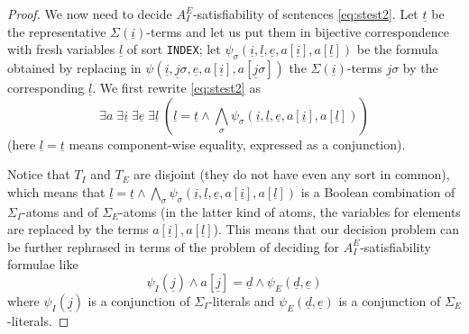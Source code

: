 \documentclass{LMCS}
\newcommand{\ud}{\ensuremath{\underline d}}
\newcommand{\ue}{\ensuremath{\underline e}}
\newcommand{\ui}{\ensuremath{\underline i}}
\newcommand{\uj}{\ensuremath{\underline j}}
\newcommand{\ut}{\ensuremath{\underline t}}
\newcommand{\ul}{\ensuremath{\underline l}}
\theoremstyle{plain}\newtheorem{assumption}[thm]{Assumption}
\theoremstyle{plain}\newtheorem{proposition}[thm]{Proposition}
\theoremstyle{plain}\newtheorem{property}[thm]{Property}
\theoremstyle{plain}\newtheorem{example}[thm]{Example}
\theoremstyle{plain}\newtheorem{claim}[thm]{Claim}
\theoremstyle{plain}\newtheorem{lemma}[thm]{Lemma}
\begin{document}
\begin{proof}
  We now need to decide $A^E_I$-satisfiability of sentences
  \eqref{eq:stest2}. Let $\ut$ be the representative
  $\Sigma(\ui)$-terms and let us put them in bijective correspondence
  with fresh variables $\ul$ of sort {\tt INDEX}; let
  $\psi_{\sigma}(\ui, \ul, \ue, a[\ui], a[\ul])$ be the formula
  obtained by replacing in $\psi(\ui, \uj\sigma, \ue,
  a[\ui],a[\uj\sigma])$ the $\Sigma(\ui)$-terms $\uj\sigma$ by the
  corresponding $\ul$. We first rewrite \eqref{eq:stest2} as
\begin{equation}\label{eq:stest3}
    \exists a\; \exists \ui\;\exists \ue\; \exists \ul\;(\ul = \ut \wedge\bigwedge_{\sigma} \psi_{\sigma}(\ui, \ul, \ue, a[\ui],a[\ul]))
  \end{equation}
  (here $\ul = \ut$ means component-wise equality, expressed as a
  conjunction).


  Notice that $T_I$ and $T_E$ are disjoint (they do not have even any
  sort in common), which means that $ \ul = \ut
  \wedge\bigwedge_{\sigma} \psi_{\sigma}(\ui, \ul, \ue,
  a[\ui],a[\ul])$ is a Boolean combination of $\Sigma_I$-atoms and of
  $\Sigma_E$-atoms (in the latter kind of atoms, the variables for
  elements are replaced by the terms $a[\ui], a[\ul]$). This means
  that our decision problem can be further rephrased in terms of the
  problem of deciding for $A^E_I$-satisfiability formulae like
  \begin{equation}\label{eq:conn}
    \psi_I(\uj) \wedge a[\uj]=\ud \wedge \psi_E(\ud,\ue)
  \end{equation}
  where $\psi_I(\uj)$ is a conjunction of $\Sigma_I$-literals and
  $\psi_E(\ud,\ue)$ is a conjunction of $\Sigma_E$-literals.



\end{proof}
\end{document}
